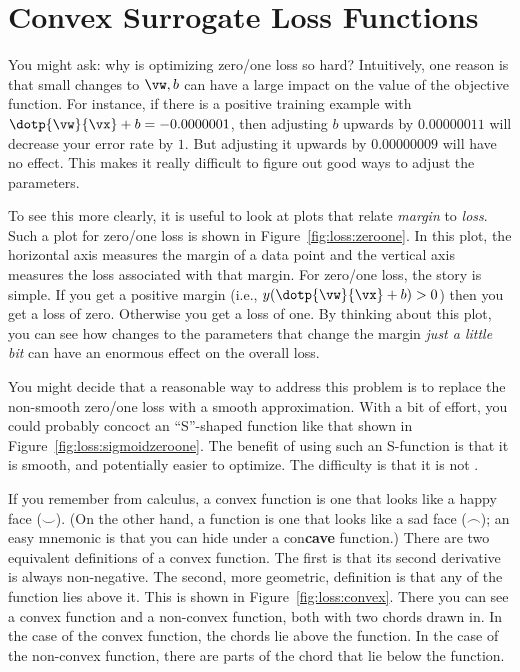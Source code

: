 \section{Convex Surrogate Loss Functions}

You might ask: why is optimizing zero/one loss so hard?  Intuitively,
one reason is that small changes to $\vw,b$ can have a large impact on
the value of the objective function.  For instance, if there is a
positive training example with $\dotp{\vw}{\vx}+b = -0.0000001$, then
adjusting $b$ upwards by $0.00000011$ will decrease your error rate by
$1$.  But adjusting it upwards by $0.00000009$ will have no effect.
This makes it really difficult to figure out good ways to adjust the
parameters.
\MoveNextFigure{-5cm}


To see this more clearly, it is useful to look at plots that relate
\emph{margin} to \emph{loss}.  Such a plot for zero/one loss is shown
in Figure~\ref{fig:loss:zeroone}.  In this plot, the horizontal axis
measures the margin of a data point and the vertical axis measures the
loss associated with that margin.  For zero/one loss, the story is
simple.  If you get a positive margin (i.e., $y(\dotp{\vw}{\vx}+b)>0$)
then you get a loss of zero.  Otherwise you get a loss of one.  By
thinking about this plot, you can see how changes to the parameters
that change the margin \emph{just a little bit} can have an enormous
effect on the overall loss.

You might decide that a reasonable way to address this problem is to
replace the non-smooth zero/one loss with a smooth approximation.
With a bit of effort, you could probably concoct an ``S''-shaped
function like that shown in Figure~\ref{fig:loss:sigmoidzeroone}.  The
benefit of using such an S-function is that it is smooth, and
potentially easier to optimize.  The difficulty is that it is not
.

If you remember from calculus, a convex function is one that looks
like a happy face ($\smile$).  (On the other hand, a 
function is one that looks like a sad face ($\frown$); an easy
mnemonic is that you can hide under a con{\bf cave} function.)  There
are two equivalent definitions of a convex function.  The first is
that its second derivative is always non-negative.  The second, more
geometric, definition is that any  of the function lies
above it.  This is shown in Figure~\ref{fig:loss:convex}.  There you
can see a convex function and a non-convex function, both with two
chords drawn in.  In the case of the convex function, the chords lie
above the function.  In the case of the non-convex function, there are
parts of the chord that lie below the function.

